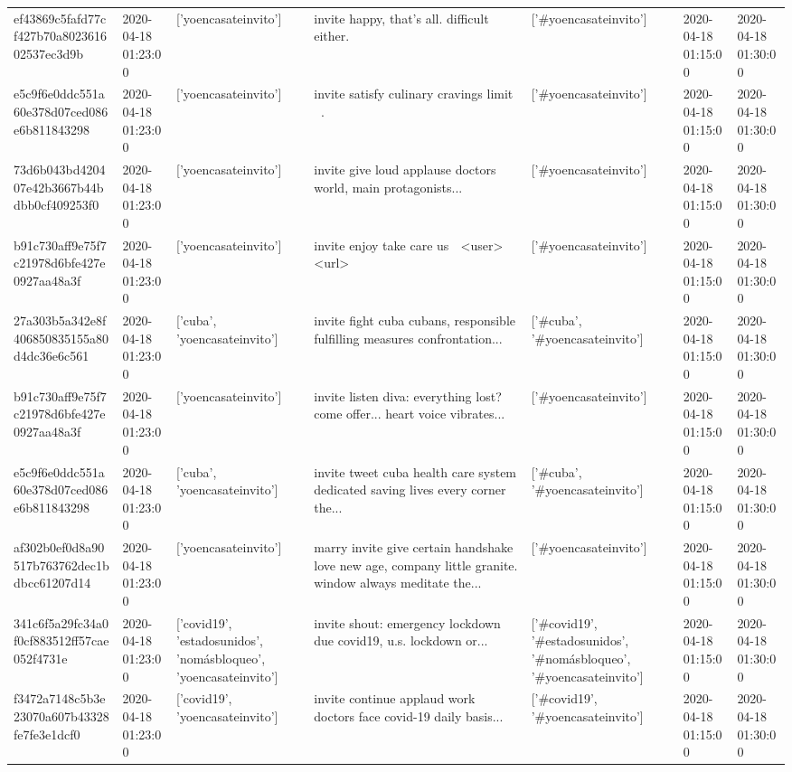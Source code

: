 \begin{tabular}{lllllll}
ef43869c5fafd77cf427b70a802361602537ec3d9b & 2020-04-18 01:23:00 & ['yoencasateinvito'] & invite happy, that's all. difficult either. & ['#yoencasateinvito'] & 2020-04-18 01:15:00 & 2020-04-18 01:30:00 \\
e5c9f6e0ddc551a60e378d07ced086e6b811843298 & 2020-04-18 01:23:00 & ['yoencasateinvito'] & invite satisfy culinary cravings limit 🤣🤣. & ['#yoencasateinvito'] & 2020-04-18 01:15:00 & 2020-04-18 01:30:00 \\
73d6b043bd420407e42b3667b44bdbb0cf409253f0 & 2020-04-18 01:23:00 & ['yoencasateinvito'] & invite give loud applause doctors world, main protagonists... & ['#yoencasateinvito'] & 2020-04-18 01:15:00 & 2020-04-18 01:30:00 \\
b91c730aff9e75f7c21978d6bfe427e0927aa48a3f & 2020-04-18 01:23:00 & ['yoencasateinvito'] & invite enjoy take care us 🌹 <user> <url> & ['#yoencasateinvito'] & 2020-04-18 01:15:00 & 2020-04-18 01:30:00 \\
27a303b5a342e8f406850835155a80d4dc36e6c561 & 2020-04-18 01:23:00 & ['cuba', 'yoencasateinvito'] & invite fight cuba cubans, responsible fulfilling measures confrontation... & ['#cuba', '#yoencasateinvito'] & 2020-04-18 01:15:00 & 2020-04-18 01:30:00 \\
b91c730aff9e75f7c21978d6bfe427e0927aa48a3f & 2020-04-18 01:23:00 & ['yoencasateinvito'] & invite listen diva: everything lost? come offer... heart voice vibrates... & ['#yoencasateinvito'] & 2020-04-18 01:15:00 & 2020-04-18 01:30:00 \\
e5c9f6e0ddc551a60e378d07ced086e6b811843298 & 2020-04-18 01:23:00 & ['cuba', 'yoencasateinvito'] & invite tweet cuba health care system dedicated saving lives every corner the... & ['#cuba', '#yoencasateinvito'] & 2020-04-18 01:15:00 & 2020-04-18 01:30:00 \\
af302b0ef0d8a90517b763762dec1bdbcc61207d14 & 2020-04-18 01:23:00 & ['yoencasateinvito'] & marry invite give certain handshake love new age, company little granite. window always meditate the... & ['#yoencasateinvito'] & 2020-04-18 01:15:00 & 2020-04-18 01:30:00 \\
341c6f5a29fc34a0f0cf883512ff57cae052f4731e & 2020-04-18 01:23:00 & ['covid19', 'estadosunidos', 'nomásbloqueo', 'yoencasateinvito'] & invite shout: emergency lockdown due covid19, u.s. lockdown or... & ['#covid19', '#estadosunidos', '#nomásbloqueo', '#yoencasateinvito'] & 2020-04-18 01:15:00 & 2020-04-18 01:30:00 \\
f3472a7148c5b3e23070a607b43328fe7fe3e1dcf0 & 2020-04-18 01:23:00 & ['covid19', 'yoencasateinvito'] & invite continue applaud work doctors face covid-19 daily basis... & ['#covid19', '#yoencasateinvito'] & 2020-04-18 01:15:00 & 2020-04-18 01:30:00 \\

\end{tabular}
